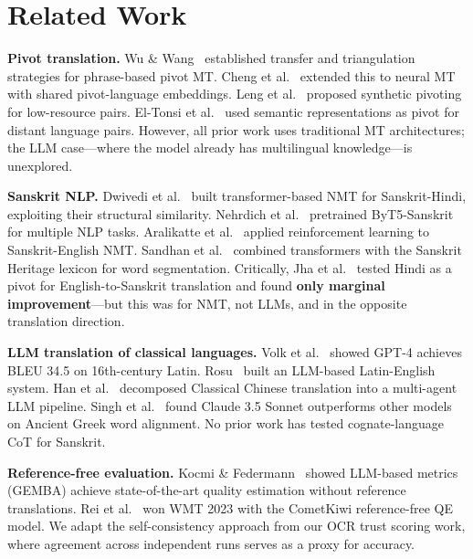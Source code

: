\documentclass[10pt,twocolumn]{article}
\begin{document}
\section{Related Work}

\textbf{Pivot translation.} Wu \& Wang~\cite{wu2007} established transfer and triangulation strategies for phrase-based pivot MT. Cheng et al.~\cite{cheng2017} extended this to neural MT with shared pivot-language embeddings. Leng et al.~\cite{leng2024} proposed synthetic pivoting for low-resource pairs. El-Tonsi et al.~\cite{eltonsi2024} used semantic representations as pivot for distant language pairs. However, all prior work uses traditional MT architectures; the LLM case---where the model already has multilingual knowledge---is unexplored.

\textbf{Sanskrit NLP.} Dwivedi et al.~\cite{dwivedi2023} built transformer-based NMT for Sanskrit-Hindi, exploiting their structural similarity. Nehrdich et al.~\cite{nehrdich2024} pretrained ByT5-Sanskrit for multiple NLP tasks. Aralikatte et al.~\cite{aralikatte2020} applied reinforcement learning to Sanskrit-English NMT. Sandhan et al.~\cite{sandhan2022} combined transformers with the Sanskrit Heritage lexicon for word segmentation. Critically, Jha et al.~\cite{jha2024} tested Hindi as a pivot for English-to-Sanskrit translation and found \textbf{only marginal improvement}---but this was for NMT, not LLMs, and in the opposite translation direction.

\textbf{LLM translation of classical languages.} Volk et al.~\cite{volk2024} showed GPT-4 achieves BLEU 34.5 on 16th-century Latin. Rosu~\cite{rosu2025} built an LLM-based Latin-English system. Han et al.~\cite{han2025} decomposed Classical Chinese translation into a multi-agent LLM pipeline. Singh et al.~\cite{singh2025} found Claude 3.5 Sonnet outperforms other models on Ancient Greek word alignment. No prior work has tested cognate-language CoT for Sanskrit.

\textbf{Reference-free evaluation.} Kocmi \& Federmann~\cite{kocmi2023} showed LLM-based metrics (GEMBA) achieve state-of-the-art quality estimation without reference translations. Rei et al.~\cite{rei2022} won WMT 2023 with the CometKiwi reference-free QE model. We adapt the self-consistency approach from our OCR trust scoring work, where agreement across independent runs serves as a proxy for accuracy.

\end{document}
